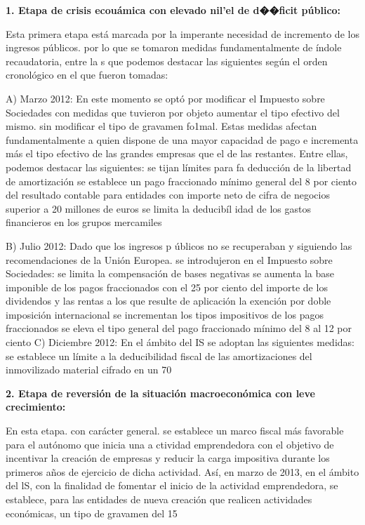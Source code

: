 \documentclass[10pt,a4paper]{article}
\begin{document}
\textbf{1. Etapa de crisis ecouámica con elevado nil'el de d��ficit público: }

Esta primera etapa está marcada por la imperante necesidad de incremento de los ingresos públicos. por lo que se tomaron medidas fundamentalmente de índole recaudatoria, entre la s que podemos destacar las siguientes según el orden cronológico en el que fueron tomadas:

A) Marzo 2012: En este momento se optó por modificar el Impuesto sobre Sociedades con medidas que tuvieron por objeto aumentar el tipo efectivo del mismo. sin modificar el tipo de gravamen fo1mal. Estas medidas afectan fundamentalmente a quien dispone de una mayor capacidad de pago e incrementa más el tipo efectivo de las grandes empresas que el de las restantes. Entre ellas, podemos destacar las siguientes: se tijan límites para fa deducción de la libertad de amortización se establece un pago fraccionado mínimo general del 8 por ciento del resultado contable para entidades con importe neto de cifra de negocios superior a 20 millones de euros se limita la deducibíl idad de los gastos financieros en los grupos mercamiles

B) Julio 2012: Dado que los ingresos p úblicos no se recuperaban y siguiendo las recomendaciones de la Unión Europea. se introdujeron en el Impuesto sobre Sociedades: se limita la compensación de bases negativas se aumenta la base imponible de los pagos fraccionados con el 25 por ciento del importe de los dividendos y las rentas a los que resulte de aplicación la exención por doble imposición internacional se incrementan los tipos impositivos de los pagos fraccionados se eleva el tipo general del pago fraccionado mínimo del 8 al 12 por ciento
C) Diciembre 2012: En el ámbito del IS se adoptan las siguientes medidas: se establece un límite a la deducibilidad fiscal de las amortizaciones del inmovilizado material cifrado en un 70%

\textbf{2. Etapa de reversión de la situación macroeconómica con leve crecimiento:}

En esta etapa. con carácter general. se establece un marco fiscal más favorable para el autónomo que inicia una a ctividad emprendedora con el objetivo de incentivar la creación de empresas y reducir la carga impositiva durante los primeros años de ejercicio de dicha actividad. Así, en marzo de 2013, en el ámbito del lS, con la finalidad de fomentar el inicio de la actividad emprendedora, se establece, para las entidades de nueva creación que realicen actividades económicas, un tipo de gravamen del 15%
\end{document}
